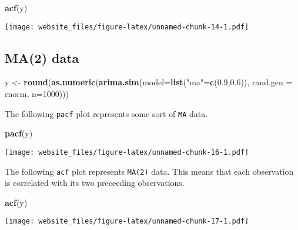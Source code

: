 \documentclass[]{book}
\newenvironment{Shaded}{\begin{snugshade}}{\end{snugshade}}
\newcommand{\KeywordTok}[1]{\textcolor[rgb]{0.13,0.29,0.53}{\textbf{#1}}}
\newcommand{\DataTypeTok}[1]{\textcolor[rgb]{0.13,0.29,0.53}{#1}}
\newcommand{\DecValTok}[1]{\textcolor[rgb]{0.00,0.00,0.81}{#1}}
\newcommand{\FloatTok}[1]{\textcolor[rgb]{0.00,0.00,0.81}{#1}}
\newcommand{\StringTok}[1]{\textcolor[rgb]{0.31,0.60,0.02}{#1}}
\newcommand{\NormalTok}[1]{#1}
\begin{document}
\begin{Shaded}
\begin{Highlighting}[]
\KeywordTok{acf}\NormalTok{(y)}
\end{Highlighting}
\end{Shaded}

\texttt{[image: website\_files/figure-latex/unnamed-chunk-14-1.pdf]}

\newpage 

\subsection{MA(2) data}\label{ma2-data}

\begin{Shaded}
\begin{Highlighting}[]
\NormalTok{y <-}\StringTok{ }\KeywordTok{round}\NormalTok{(}\KeywordTok{as.numeric}\NormalTok{(}\KeywordTok{arima.sim}\NormalTok{(}\DataTypeTok{model=}\KeywordTok{list}\NormalTok{(}\StringTok{"ma"}\NormalTok{=}\KeywordTok{c}\NormalTok{(}\FloatTok{0.9}\NormalTok{,}\FloatTok{0.6}\NormalTok{)), }\DataTypeTok{rand.gen =}\NormalTok{ rnorm, }\DataTypeTok{n=}\DecValTok{1000}\NormalTok{)))}
\end{Highlighting}
\end{Shaded}

The following \texttt{pacf} plot represents some sort of \texttt{MA}
data.

\begin{Shaded}
\begin{Highlighting}[]
\KeywordTok{pacf}\NormalTok{(y)}
\end{Highlighting}
\end{Shaded}

\texttt{[image: website\_files/figure-latex/unnamed-chunk-16-1.pdf]}

\newpage

The following \texttt{acf} plot represents \texttt{MA(2)} data. This
means that each observation is correlated with its two preceeding
observations.

\begin{Shaded}
\begin{Highlighting}[]
\KeywordTok{acf}\NormalTok{(y)}
\end{Highlighting}
\end{Shaded}

\texttt{[image: website\_files/figure-latex/unnamed-chunk-17-1.pdf]}


\end{document}
